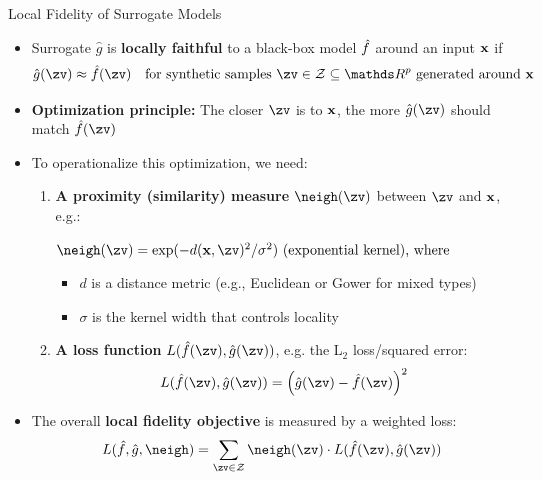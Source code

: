 \documentclass[10pt,compress,t,notes=noshow, xcolor=table]{beamer}
\newcommand{\gh}{\hat{g}}
\begin{document}
\begin{frame}{Local Fidelity of Surrogate Models}

  \begin{itemize}
    \item Surrogate \( \gh \) is \textbf{locally faithful} to a black-box model \( \hat{f} \) around an input \( \mathbf{x} \) if
    \[
    \gh(\zv) \approx \fh(\zv) \quad \text{for synthetic samples } \zv \in \Zspace \subseteq \R^p \text{ generated around } \xv
    \]

    \pause

    \item \textbf{Optimization principle:} The closer \( \zv \) is to \( \mathbf{x} \), the more \( \gh(\zv) \) should match \( \fh(\zv) \)

    \pause

    \item To operationalize this optimization, we need:
    \begin{enumerate}
      \item \textbf{A proximity (similarity) measure} $\neigh(\zv)$ between $\zv$ and $\mathbf{x}$, e.g.:
      
        \medskip
        \centerline{$
        \neigh(\zv) = \exp(-d(\xv, \zv)^2 / \sigma^2)  \text{ (exponential kernel), where}
        $}
        \medskip
        
        \begin{itemize}
            \item \( d \) is a distance metric (e.g., Euclidean or Gower for mixed types)
            \item \( \sigma \) is the kernel width that controls locality
        \end{itemize}
        
        

      \pause
      \item \textbf{A loss function} \( L(\fh(\zv), \gh(\zv)) \), e.g. the L$_2$ loss/squared error:
        \[
        L(\fh(\zv), \gh(\zv)) = \left( \gh(\zv) - \fh(\zv) \right)^2
        \]
    \end{enumerate}

    \pause

    \item The overall \textbf{local fidelity objective} is measured by a weighted loss:
    \[
    L(\fh, \gh, \neigh) = \sum_{\zv \in \Zspace} \neigh(\zv) \cdot L(\fh(\zv), \gh(\zv))
    \]
  \end{itemize}
\end{frame}
\end{document}
